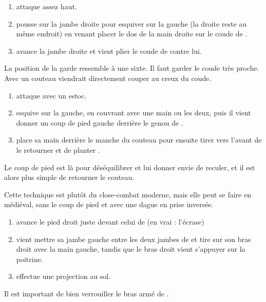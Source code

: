 \begin{exercice}

\begin{enumerate}
	\item \A attaque assez haut.
	
	\item \D pousse sur la jambe droite pour esquiver sur la gauche (la droite reste au même endroit) en venant placer le dos de la main droite sur le coude de \A.
	
	\item \D avance la jambe droite et vient plier le coude de \A contre lui.
\end{enumerate}

La position de la garde ressemble à une sixte.
Il faut garder le coude très proche.
Avec un couteau \D viendrait directement couper au creux du coude.

\end{exercice}


\begin{technique}

\begin{enumerate}
	\item \A attaque avec un estoc.
	
	\item \D esquive sur la gauche, en couvrant avec une main ou les deux, puis il vient donner un coup de pied gauche derrière le genou de \A.
	
	\item \D place sa main derrière le manche du couteau pour ensuite tirer vers l'avant de le retourner et de planter \A.
\end{enumerate}

Le coup de pied est là pour déséquilibrer \A et lui donner envie de reculer, et il est alors plus simple de retourner le couteau.

Cette technique est plutôt du close-combat moderne, mais elle peut se faire en médiéval, sans le coup de pied et avec une dague en prise inversée.

\end{technique}


\begin{technique}

\begin{enumerate}
	\item \D avance le pied droit juste devant celui de \A (en vrai : l'écrase)
	
	\item \D vient mettre sa jambe gauche entre les deux jambes de \A et tire sur son bras droit avec la main gauche, tandis que le bras droit vient s'appuyer sur la poitrine.
	
	\item \D effectue une projection au sol.
\end{enumerate}

Il est important de bien verrouiller le bras armé de \A.

\end{technique}


